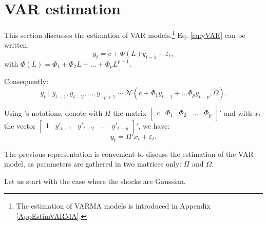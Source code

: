 \documentclass[
  12pt,
]{book}
\theoremstyle{definition}
\theoremstyle{definition}
\theoremstyle{definition}
\theoremstyle{definition}
\theoremstyle{remark}
\begin{document}
\section{VAR estimation}\label{estimVAR}

This section discusses the estimation of VAR models.\footnote{The estimation of VARMA models is introduced in Appendix \ref{AppEstimVARMA}.} Eq. \eqref{eq:yVAR} can be written:
\[
y_{t}=c+\Phi(L)y_{t-1}+\varepsilon_{t},
\]
with \(\Phi(L) = \Phi_1 + \Phi_2 L + \dots + \Phi_p L^{p-1}\).

Consequently:
\[
y_{t}\mid y_{t-1},y_{t-2},\ldots,y_{-p+1}\sim \mathcal{N}(c+\Phi_{1}y_{t-1}+\ldots\Phi_{p}y_{t-p},\Omega).
\]

Using \citet{Hamilton_1994}'s notations, denote with \(\Pi\) the matrix \(\left[\begin{array}{ccccc}
c & \Phi_{1} & \Phi_{2} & \ldots & \Phi_{p}\end{array}\right]'\) and with \(x_{t}\) the vector \(\left[\begin{array}{ccccc}
1 & y'_{t-1} & y'_{t-2} & \ldots & y'_{t-p}\end{array}\right]'\), we have:
\begin{equation}
y_{t}= \Pi'x_{t} + \varepsilon_{t}.
\label{eq:PIVAR}
\end{equation}

The previous representation is convenient to discuss the estimation of the VAR model, as parameters are gathered in two matrices only: \(\Pi\) and \(\Omega\).

Let us start with the case where the shocks are Gaussian.
\end{document}
